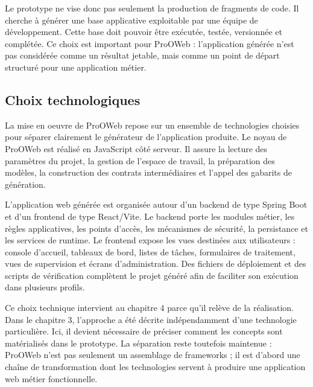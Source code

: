 Le prototype ne vise donc pas seulement la production de fragments de code. Il cherche à générer une base applicative exploitable par une équipe de développement. Cette base doit pouvoir être exécutée, testée, versionnée et complétée. Ce choix est important pour ProOWeb : l'application générée n'est pas considérée comme un résultat jetable, mais comme un point de départ structuré pour une application métier.

\subsection{Choix technologiques}

La mise en oeuvre de ProOWeb repose sur un ensemble de technologies choisies pour séparer clairement le générateur de l'application produite. Le noyau de ProOWeb est réalisé en JavaScript côté serveur. Il assure la lecture des paramètres du projet, la gestion de l'espace de travail, la préparation des modèles, la construction des contrats intermédiaires et l'appel des gabarits de génération.

L'application web générée est organisée autour d'un backend de type Spring Boot et d'un frontend de type React/Vite. Le backend porte les modules métier, les règles applicatives, les points d'accès, les mécanismes de sécurité, la persistance et les services de runtime. Le frontend expose les vues destinées aux utilisateurs : console d'accueil, tableaux de bord, listes de tâches, formulaires de traitement, vues de supervision et écrans d'administration. Des fichiers de déploiement et des scripts de vérification complètent le projet généré afin de faciliter son exécution dans plusieurs profils.

Ce choix technique intervient au chapitre 4 parce qu'il relève de la réalisation. Dans le chapitre 3, l'approche a été décrite indépendamment d'une technologie particulière. Ici, il devient nécessaire de préciser comment les concepts sont matérialisés dans le prototype. La séparation reste toutefois maintenue : ProOWeb n'est pas seulement un assemblage de frameworks ; il est d'abord une chaîne de transformation dont les technologies servent à produire une application web métier fonctionnelle.

